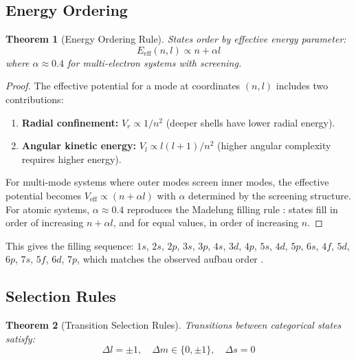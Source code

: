 \documentclass[11pt,twocolumn,a4paper]{article}
\newtheorem{theorem}{Theorem}[section]
\theoremstyle{definition}
\theoremstyle{remark}
\begin{document}
\subsection{Energy Ordering}

\begin{theorem}[Energy Ordering Rule]
\label{thm:energy_ordering}
States order by effective energy parameter:
\begin{equation}
E_{\mathrm{eff}}(n, l) \propto n + \alpha l
\label{eq:energy_ordering}
\end{equation}
where $\alpha \approx 0.4$ for multi-electron systems with screening.
\end{theorem}

\begin{proof}
The effective potential for a mode at coordinates $(n, l)$ includes two contributions:
\begin{enumerate}
\item \textbf{Radial confinement:} $V_r \propto 1/n^2$ (deeper shells have lower radial energy).
\item \textbf{Angular kinetic energy:} $V_l \propto l(l+1)/n^2$ (higher angular complexity requires higher energy).
\end{enumerate}

For multi-mode systems where outer modes screen inner modes, the effective potential becomes $V_{\mathrm{eff}} \propto (n + \alpha l)$ with $\alpha$ determined by the screening structure. For atomic systems, $\alpha \approx 0.4$ reproduces the Madelung filling rule \citep{madelung1936}: states fill in order of increasing $n + \alpha l$, and for equal values, in order of increasing $n$.
\end{proof}

This gives the filling sequence: $1s$, $2s$, $2p$, $3s$, $3p$, $4s$, $3d$, $4p$, $5s$, $4d$, $5p$, $6s$, $4f$, $5d$, $6p$, $7s$, $5f$, $6d$, $7p$, which matches the observed aufbau order \citep{schwarz2010}.

\subsection{Selection Rules}

\begin{theorem}[Transition Selection Rules]
\label{thm:selection}
Transitions between categorical states satisfy:
\begin{equation}
\Delta l = \pm 1, \quad \Delta m \in \{0, \pm 1\}, \quad \Delta s = 0
\label{eq:selection_rules}
\end{equation}
\end{theorem}
\end{document}
